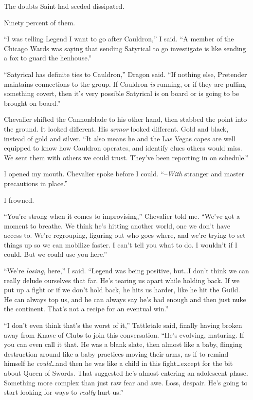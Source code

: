 The doubts Saint had seeded dissipated.



Ninety percent of them.



``I was telling Legend I want to go after Cauldron,'' I said.  ``A member of the Chicago Wards was saying that sending Satyrical to go investigate is like sending a fox to guard the henhouse.''



``Satyrical has definite ties to Cauldron,'' Dragon said.  ``If nothing else, Pretender maintains connections to the group.  If Cauldron \emph{is} running, or if they are pulling something covert, then it's very possible Satyrical is on board or is going to be brought on board.''



Chevalier shifted the Cannonblade to his other hand, then stabbed the point into the ground.  It looked different.  His \emph{armor} looked different.  Gold and black, instead of gold and silver.  ``It also means he and the Las Vegas capes are well equipped to know how Cauldron operates, and identify clues others would miss.  We sent them with others we could trust.  They've been reporting in on schedule.''



I opened my mouth.  Chevalier spoke before I could.  ``--\emph{With }stranger and master precautions in place.''



I frowned.



``You're strong when it comes to improvising,'' Chevalier told me.  ``We've got a moment to breathe.  We think he's hitting another world, one we don't have access to.  We're regrouping, figuring out who goes where, and we're trying to set things up so we can mobilize faster.  I can't tell you what to do.  I wouldn't if I could.  But we could use you here.''



``We're \emph{losing}, here,'' I said.  ``Legend was being positive, but\ldots I don't think we can really delude ourselves that far.  He's tearing us apart while holding back.  If we put up a fight or if we don't hold back, he hits us harder, like he hit the Guild.  He can always top us, and he can always say he's had enough and then just nuke the continent.  That's not a recipe for an eventual win.''



``I don't even think that's the worst of it,'' Tattletale said, finally having broken away from Knave of Clubs to join this conversation.  ``He's evolving, maturing.  If you can even call it that.  He was a blank slate, then almost like a baby, flinging destruction around like a baby practices moving their arms, as if to remind himself he \emph{could}\ldots and then he was like a child in this fight\ldots except for the bit about Queen of Swords.  That suggested he's almost entering an adolescent phase.  Something more complex than just raw fear and awe.  Loss, despair.  He's going to start looking for ways to \emph{really} hurt us.''



